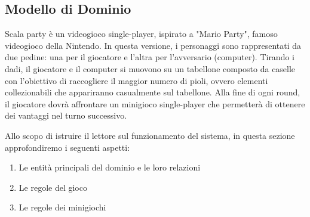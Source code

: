 \subsection{Modello di Dominio}
Scala party è un videogioco single-player, ispirato a "Mario Party",
famoso videogioco della Nintendo. In questa versione, i personaggi 
sono rappresentati da due pedine: una per il giocatore e l'altra per
l'avversario (computer). Tirando i dadi, il giocatore e il computer 
si muovono su un tabellone composto da caselle con l'obiettivo di
raccogliere il maggior numero di pioli, ovvero elementi collezionabili
che appariranno casualmente sul tabellone. Alla fine di ogni round,
il giocatore dovrà affrontare un minigioco single-player che permetterà
di ottenere dei vantaggi nel turno successivo.


Allo scopo di istruire il lettore sul funzionamento del sistema,
in questa sezione approfondiremo i seguenti aspetti:
\begin{enumerate}
    \item Le entità principali del dominio e le loro relazioni
    \item Le regole del gioco
    \item Le regole dei minigiochi
\end{enumerate}
